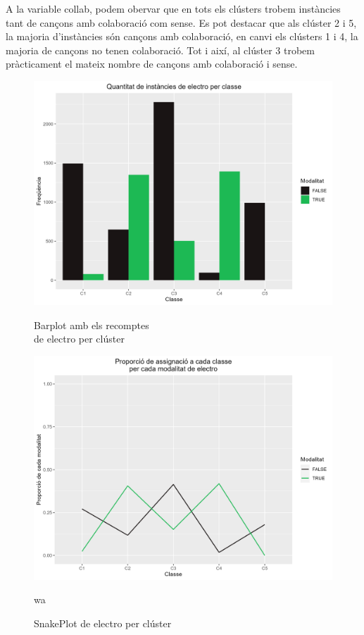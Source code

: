 A la variable collab, podem obervar que en tots els clústers trobem instàncies tant de cançons amb colaboració com sense. Es pot destacar que als clúster 2 i 5, la majoria d'instàncies són cançons amb colaboració, en canvi els clústers 1 i 4, la majoria de cançons no tenen colaboració. Tot i així, al clúster 3 trobem pràcticament el mateix nombre de cançons amb colaboració i sense.

\begin{figure}[H]
\centering
    \begin{minipage}{.49\textwidth}
        \centering
        \includegraphics[width=0.95\linewidth]{Images/5_Profiling/categoriques/cat/Cat_BarPlot_electro.png}
        \caption{Barplot amb els recomptes \\ de electro per clúster}
        \label{fig:Cat_BarPlot_electro}
    \end{minipage}%
    \begin{minipage}{.49\textwidth}
        \centering
        \includegraphics[width=0.95\linewidth]{Images/5_Profiling/categoriques/cat/Cat_SnakePlot_electro.png}
        \caption{SnakePlot de electro per clúster}
        \label{fig:Cat_SnakePlot_electro}
wa    \end{minipage}%
\end{figure}


